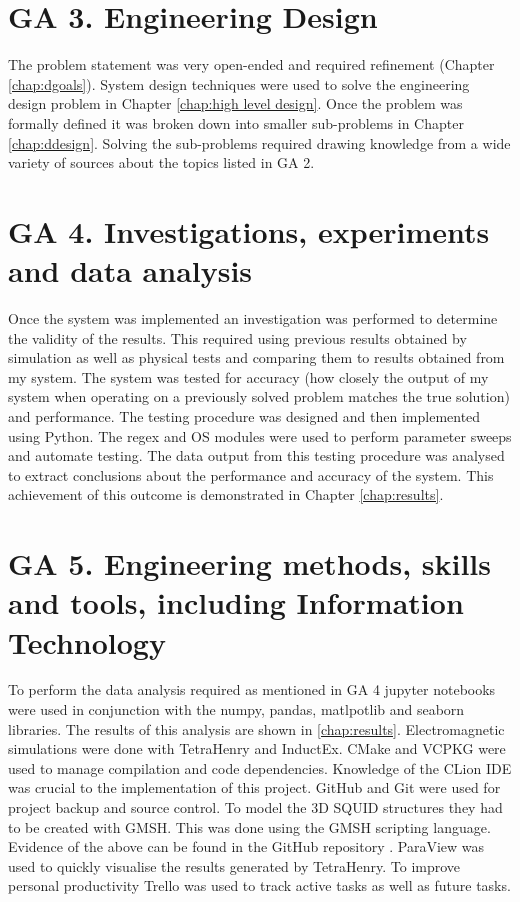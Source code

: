 \section{GA 3. Engineering Design}
The problem statement was very open-ended and required refinement (Chapter \ref{chap:dgoals}). System design techniques were used to solve the engineering design problem in Chapter \ref{chap:high level design}. Once the problem was formally defined it was broken down into smaller sub-problems in Chapter \ref{chap:ddesign}. Solving the sub-problems required drawing knowledge from a wide variety of sources about the topics listed in GA 2.
\section{GA 4. Investigations, experiments and data analysis}
Once the system was implemented an investigation was performed to determine the validity of the results. This required using previous results obtained by simulation as well as physical tests and comparing them to results obtained from my system. The system was tested for accuracy (how closely the output of my system when operating on a previously solved problem matches the true solution) and performance. The testing procedure was designed and then implemented using Python. The regex and OS modules were used to perform parameter sweeps and automate testing. The data output from this testing procedure was analysed to extract conclusions about the performance and accuracy of the system. This achievement of this outcome is demonstrated in Chapter \ref{chap:results}. 
\section{GA 5. Engineering methods, skills and tools, including Information Technology}
To perform the data analysis required as mentioned in GA 4 jupyter notebooks were used in conjunction with the numpy, pandas, matlpotlib and seaborn libraries. The results of this analysis are shown in \ref{chap:results}. Electromagnetic simulations were done with TetraHenry and InductEx. CMake and VCPKG were used to manage compilation and code dependencies. Knowledge of the CLion IDE was crucial to the implementation of this project. GitHub and Git were used for project backup and source control. To model the 3D SQUID structures they had to be created with GMSH. This was done using the GMSH scripting language. Evidence of the above can be found in the GitHub repository \cite{paulcode}. ParaView was used to quickly visualise the results generated by TetraHenry. To improve personal productivity Trello was used to track active tasks as well as future tasks.

